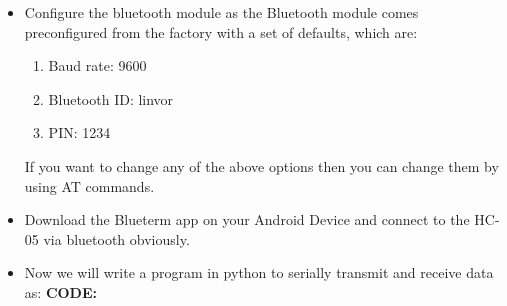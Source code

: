 \documentclass[11pt,a4paper]{article}
\begin{document}
	\begin{itemize}
		\item Configure the bluetooth module as the Bluetooth module comes preconfigured from the factory with a set of defaults, which are:
			\begin{enumerate}
			\item Baud rate: 9600
			\item Bluetooth ID: linvor
			\item PIN: 1234
			\end{enumerate}
		 If you want to change any of the above options then you can change them by using AT commands.
		\item Download the Blueterm app on your Android Device and connect to the HC-05 via bluetooth obviously.
		\item Now we will write a program in python to serially transmit and receive data as:
		\newline \textbf{CODE:}
		\newline 
		\vspace{0.3cm}
		

\end{itemize}
\end{document}
